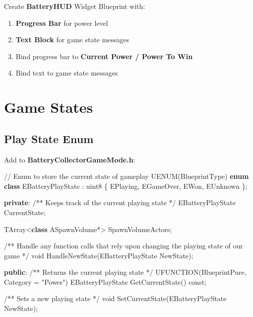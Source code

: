 \documentclass[
  letterpaper,
  DIV=11,
  numbers=noendperiod]{scrartcl}
\newenvironment{Shaded}{\begin{snugshade}}{\end{snugshade}}
\newcommand{\AttributeTok}[1]{\textcolor[rgb]{0.40,0.45,0.13}{#1}}
\newcommand{\CommentTok}[1]{\textcolor[rgb]{0.37,0.37,0.37}{#1}}
\newcommand{\DataTypeTok}[1]{\textcolor[rgb]{0.68,0.00,0.00}{#1}}
\newcommand{\KeywordTok}[1]{\textcolor[rgb]{0.00,0.23,0.31}{\textbf{#1}}}
\newcommand{\NormalTok}[1]{\textcolor[rgb]{0.00,0.23,0.31}{#1}}
\newcommand{\OperatorTok}[1]{\textcolor[rgb]{0.37,0.37,0.37}{#1}}
\newcommand{\StringTok}[1]{\textcolor[rgb]{0.13,0.47,0.30}{#1}}
\providecommand{\tightlist}{%
  \setlength{\itemsep}{0pt}\setlength{\parskip}{0pt}}
\begin{document}
Create \textbf{BatteryHUD} Widget Blueprint with:

\begin{enumerate}
\def\labelenumi{\arabic{enumi}.}
\tightlist
\item
  \textbf{Progress Bar} for power level
\item
  \textbf{Text Block} for game state messages
\item
  Bind progress bar to \textbf{Current Power / Power To Win}
\item
  Bind text to game state messages
\end{enumerate}

\section{Game States}\label{game-states}

\subsection{Play State Enum}\label{play-state-enum}

Add to \textbf{BatteryCollectorGameMode.h}:

\begin{Shaded}
\begin{Highlighting}[]
\CommentTok{// Enum to store the current state of gameplay}
\NormalTok{UENUM}\OperatorTok{(}\NormalTok{BlueprintType}\OperatorTok{)}
\KeywordTok{enum} \KeywordTok{class}\NormalTok{ EBatteryPlayState }\OperatorTok{:}\NormalTok{ uint8}
\OperatorTok{\{}
\NormalTok{    EPlaying}\OperatorTok{,}
\NormalTok{    EGameOver}\OperatorTok{,}
\NormalTok{    EWon}\OperatorTok{,}
\NormalTok{    EUnknown}
\OperatorTok{\};}

\KeywordTok{private}\OperatorTok{:}
    \CommentTok{/** Keeps track of the current playing state */}
\NormalTok{    EBatteryPlayState CurrentState}\OperatorTok{;}
    
\NormalTok{    TArray}\OperatorTok{\textless{}}\KeywordTok{class}\NormalTok{ ASpawnVolume}\OperatorTok{*\textgreater{}}\NormalTok{ SpawnVolumeActors}\OperatorTok{;}
    
    \CommentTok{/** Handle any function calls that rely upon changing the playing state of our game */}
    \DataTypeTok{void}\NormalTok{ HandleNewState}\OperatorTok{(}\NormalTok{EBatteryPlayState NewState}\OperatorTok{);}

\KeywordTok{public}\OperatorTok{:}
    \CommentTok{/** Returns the current playing state */}
\NormalTok{    UFUNCTION}\OperatorTok{(}\NormalTok{BlueprintPure}\OperatorTok{,}\NormalTok{ Category }\OperatorTok{=} \StringTok{"Power"}\OperatorTok{)}
\NormalTok{    EBatteryPlayState GetCurrentState}\OperatorTok{()} \AttributeTok{const}\OperatorTok{;}
    
    \CommentTok{/** Sets a new playing state */}
    \DataTypeTok{void}\NormalTok{ SetCurrentState}\OperatorTok{(}\NormalTok{EBatteryPlayState NewState}\OperatorTok{);}
\end{Highlighting}
\end{Shaded}
\end{document}
